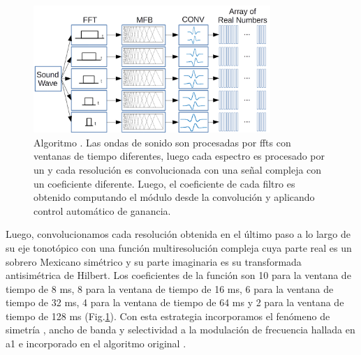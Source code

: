 \begin{figure}[h!]
    \centering
    \includegraphics[width=0.8\textwidth]{MRSTSA.png}
    \caption{Algoritmo . Las ondas de sonido son procesadas por \glspl{fft} con ventanas de tiempo diferentes, luego cada espectro es procesado por
    un  y cada resolución es convolucionada con una señal compleja con un coeficiente diferente. Luego, el coeficiente de cada filtro
    es obtenido computando el módulo desde la convolución y aplicando control automático de ganancia.}
    \label{fig:MRSTSA}
\end{figure}

Luego, convolucionamos cada resolución obtenida en el último paso a lo largo de su eje tonotópico con una función multiresolución compleja cuya parte real es un sobrero Mexicano simétrico y su parte imaginaria es su transformada antisimétrica de Hilbert. Los coeficientes de la función son 10 para la ventana de tiempo de 8 ms, 8 para la ventana de tiempo de 16 ms, 6 para la ventana de tiempo de 32 ms, 4 para la ventana de tiempo de 64 ms y 2 para la ventana de tiempo de 128 ms (Fig.\ref{fig:MRSTSA}). Con esta estrategia incorporamos el fenómeno de simetría \cite{shamma_1993}, ancho de banda \cite{schreiner_1990} y selectividad a la modulación de frecuencia \cite{shamma_1993,heil_1992,mendelson_1985} hallada en \gls{a1} e incorporado en el algoritmo original \cite{wang_1995}.


